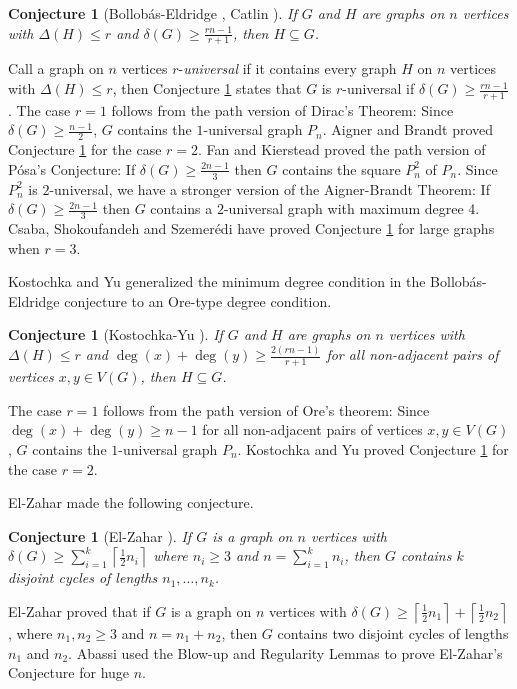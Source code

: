 \documentclass[oneside,12pt]{memoir}
\newtheorem{conjecture}[theorem]{Conjecture}
\newcommand{\ceiling}[1]{\left\lceil#1\right\rceil}
\begin{document}
\begin{conjecture}[Bollob\'as-Eldridge \cite{BE1}, Catlin \cite{Cat}]
\label{con:BE} If $G$ and $H$ are graphs on $n$ vertices with $\Delta(H)\leq r$ and $\delta(G)\geq \frac{rn-1}{r+1}$, then $H\subseteq G$.
\end{conjecture}
Call a graph on $n$ vertices $r$-\emph{universal} if it contains
every graph $H$ on $n$ vertices with $\Delta(H)\leq r$, then Conjecture \ref{con:BE} states that $G$ is $r$-universal if $\delta(G)\geq \frac{rn-1}{r+1}$.  The case $r=1$ follows from the path version of Dirac's Theorem:
Since $\delta(G)\ge\frac{n-1}{2}$, $G$ contains the $1$-universal
graph $P_{n}$. Aigner and Brandt \cite{AB} proved Conjecture \ref{con:BE}
for the case $r=2$. Fan and Kierstead \cite{FK2} proved the path version
of P\'osa's Conjecture: If $\delta(G)\ge\frac{2n-1}{3}$
then $G$ contains the square $P_{n}^{2}$ of $P_{n}$.
Since $P_{n}^2$ is $2$-universal, we have a stronger version of the
Aigner-Brandt Theorem: If $\delta(G)\ge\frac{2n-1}{3}$ then $G$ contains a $2$-universal graph with maximum degree 4.  Csaba, Shokoufandeh and Szemer\'edi \cite{CSS} have proved Conjecture \ref{con:BE} for large graphs when $r=3$.

Kostochka and Yu generalized the minimum degree condition in the Bollob\'as-Eldridge conjecture to an Ore-type degree condition.
\begin{conjecture}[Kostochka-Yu \cite{KY1}]
\label{con:KY}
If $G$ and $H$ are graphs on $n$ vertices with $\Delta(H)\leq r$ and $\deg(x)+\deg(y)\geq \frac{2(rn-1)}{r+1}$ for all non-adjacent pairs of vertices $x,y\in V(G)$, then $H\subseteq G$.  
\end{conjecture}
The case $r=1$ follows from the path version of Ore's theorem: Since $\deg(x)+\deg(y)\geq n-1$ for all non-adjacent pairs of vertices $x,y\in V(G)$, $G$ contains the $1$-universal graph $P_n$. Kostochka and Yu \cite{KY2} proved Conjecture \ref{con:KY} for the case $r=2$.

El-Zahar made the following conjecture.
\begin{conjecture}[El-Zahar \cite{EZ}]
If $G$ is a graph on $n$ vertices with $\delta(G)\geq\sum_{i=1}^{k}\ceiling{\frac{1}{2}n_{i}}$
where $n_{i}\geq3$ and $n=\sum_{i=1}^{k}n_{i}$, then $G$ contains
$k$ disjoint cycles of lengths $n_{1},\dots,n_{k}$. 
\end{conjecture}
El-Zahar proved that if $G$ is a graph on $n$ vertices
with $\delta(G)\geq\ceiling{\frac{1}{2}n_{1}}+\ceiling{\frac{1}{2}n_{2}}$,
where $n_{1},n_{2}\geq3$ and $n=n_{1}+n_{2}$, then $G$ contains
two disjoint cycles of lengths $n_{1}$ and $n_{2}$.  Abassi \cite{Abas} used the Blow-up and Regularity Lemmas to prove El-Zahar's Conjecture for huge $n$.
\end{document}
